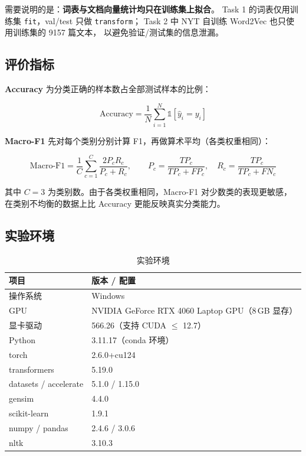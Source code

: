 \documentclass[12pt,a4paper]{ctexart}
\newcommand{\fpath}[1]{\texttt{#1}}
\begin{document}
需要说明的是：\textbf{词表与文档向量统计均只在训练集上拟合}。
Task 1 的词表仅用训练集 \fpath{fit}，val/test 只做 \fpath{transform}；
Task 2 中 NYT 自训练 Word2Vec 也只使用训练集的 9157 篇文本，
以避免验证/测试集的信息泄漏。

\subsection{评价指标}

\textbf{Accuracy} 为分类正确的样本数占全部测试样本的比例：

\begin{equation}
\mathrm{Accuracy} = \frac{1}{N}\sum_{i=1}^{N}\mathbb{1}\left[\hat{y}_i = y_i\right]
\end{equation}

\textbf{Macro-F1} 先对每个类别分别计算 F1，再做算术平均（各类权重相同）：

\begin{equation}
\mathrm{Macro\text{-}F1} = \frac{1}{C}\sum_{c=1}^{C} \frac{2P_c R_c}{P_c + R_c},
\qquad
P_c=\frac{TP_c}{TP_c+FP_c},\quad
R_c=\frac{TP_c}{TP_c+FN_c}
\end{equation}

其中 $C=3$ 为类别数。由于各类权重相同，Macro-F1 对少数类的表现更敏感，
在类别不均衡的数据上比 Accuracy 更能反映真实分类能力。

\subsection{实验环境}

\begin{table}[htbp]
\centering
\small
\caption{实验环境}
\label{tab:env}
\begin{tabular}{ll}
\toprule
项目 & 版本 / 配置 \\
\midrule
操作系统 & Windows \\
GPU & NVIDIA GeForce RTX 4060 Laptop GPU（8\,GB 显存） \\
显卡驱动 & 566.26（支持 CUDA $\le$ 12.7） \\
Python & 3.11.17（conda 环境） \\
torch & 2.6.0+cu124 \\
transformers & 5.19.0 \\
datasets / accelerate & 5.1.0 / 1.15.0 \\
gensim & 4.4.0 \\
scikit-learn & 1.9.1 \\
numpy / pandas & 2.4.6 / 3.0.6 \\
nltk & 3.10.3 \\
\bottomrule
\end{tabular}
\end{table}
\end{document}
